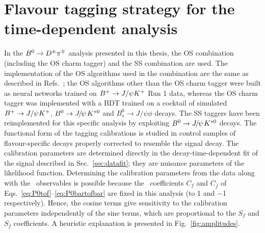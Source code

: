 \section[Flavour tagging strategy for the $\Bz\to\Dpm\pimp$ time-dependent analysis]{Flavour tagging strategy for the \boldmath{$\Bz\to\Dpm\pimp$} time-dependent analysis}
\label{sec:tagging:strategy}
In the $\Bz\to\Dpm\pimp$ analysis presented in this thesis, the OS combination (including the OS charm tagger) and the SS
combination are used. The implementation of the OS algorithms used in the combination are the same as described
in Refs.~\cite{LHCb-PAPER-2011-027,LHCb-PAPER-2015-027}; the OS algorithms other than the OS charm tagger were built as neural networks
trained on $B^+\rightarrow J/\psi K^+$ Run 1 data, whereas the OS charm tagger was implemented with a BDT trained on a cocktail of simulated
$B^+\rightarrow J/\psi K^+$, $\Bz\to\jpsi\Kstarz$ and $B^0_s\to J/\psi\phi$ decays.
The SS taggers have been reimplemented for this specific analysis by exploiting $\Bz\to\jpsi\Kstarz$ decays.
The functional form of the tagging calibrations is studied in control samples of
flavour-specific decays properly corrected to resemble the signal decay.
The calibration parameters are determined directly in the decay-time-dependent
fit of the signal described in Sec.~\ref{sec:datafit};
they are nuisance parameters of the likelihood function.
Determining the calibration parameters from the data along with
the \CP~observables is possible because the \CP~coefficients $C_f$ and $C_{\bar f}$ of Eqs.~\ref{eq:P0tof}--\ref{eq:P0bartofbar} are fixed in this analysis
(to \num{+1} and \num{-1} respectively). Hence, the cosine terms give sensitivity to the calibration parameters
independently of the sine terms, which are proportional to the $S_f$ and $S_{\bar{f}}$ coefficients. A heuristic explanation is presented in
Fig.~\ref{fig:amplitudes}.
